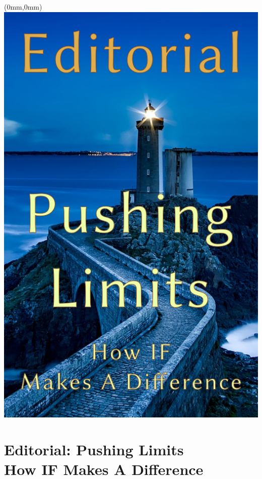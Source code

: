 \documentclass[11.75pt,openany,final]{memoir}
\begin{document}
\thispagestyle{empty} %
\newpage
\chapter*{}
\begin{textblock*}{70.9mm}(0mm,0mm)
  \includegraphics[width=\paperwidth]{./media/images/editorial_splash}
\end{textblock*}
\clearpage
\chapter{Editorial: Pushing Limits\\ \small{How IF Makes A Difference}}

\end{document}
